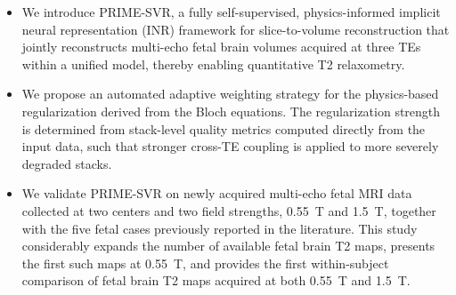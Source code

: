 \documentclass[preprint,authoryear,12pt]{elsarticle}
\begin{document}
\begin{itemize}

\item We introduce PRIME-SVR, a fully self-supervised, physics-informed implicit neural representation (INR) framework for slice-to-volume reconstruction that jointly reconstructs multi-echo fetal brain volumes acquired at three TEs within a unified model, thereby enabling quantitative T2 relaxometry.

\item We propose an automated adaptive weighting strategy for the physics-based regularization derived from the Bloch equations. The regularization strength is determined from stack-level quality metrics computed directly from the input data, such that stronger cross-TE coupling is applied to more severely degraded stacks.

\item We validate PRIME-SVR on newly acquired multi-echo fetal MRI data collected at two centers and two field strengths, 0.55~T and 1.5~T, together with the five fetal cases previously reported in the literature. This study considerably expands the number of available fetal brain T2 maps, presents the first such maps at 0.55~T, and provides the first within-subject comparison of fetal brain T2 maps acquired at both 0.55~T and 1.5~T.

\end{itemize}
\end{document}
